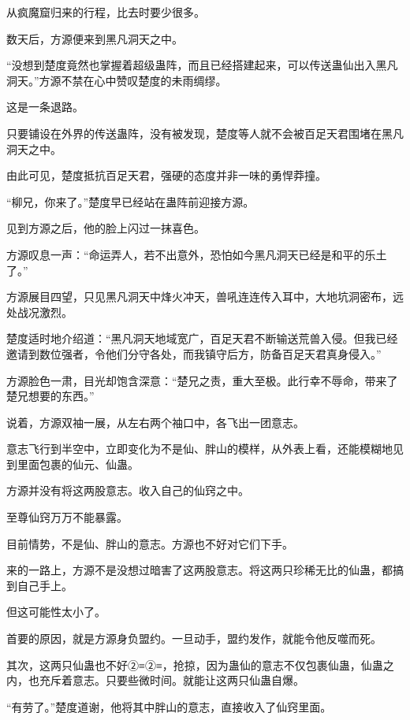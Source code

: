 
\begin{this_body}

从疯魔窟归来的行程，比去时要少很多。

数天后，方源便来到黑凡洞天之中。

“没想到楚度竟然也掌握着超级蛊阵，而且已经搭建起来，可以传送蛊仙出入黑凡洞天。”方源不禁在心中赞叹楚度的未雨绸缪。

这是一条退路。

只要铺设在外界的传送蛊阵，没有被发现，楚度等人就不会被百足天君围堵在黑凡洞天之中。

由此可见，楚度抵抗百足天君，强硬的态度并非一味的勇悍莽撞。

“柳兄，你来了。”楚度早已经站在蛊阵前迎接方源。

见到方源之后，他的脸上闪过一抹喜色。

方源叹息一声：“命运弄人，若不出意外，恐怕如今黑凡洞天已经是和平的乐土了。”

方源展目四望，只见黑凡洞天中烽火冲天，兽吼连连传入耳中，大地坑洞密布，远处战况激烈。

楚度适时地介绍道：“黑凡洞天地域宽广，百足天君不断输送荒兽入侵。但我已经邀请到数位强者，令他们分守各处，而我镇守后方，防备百足天君真身侵入。”

方源脸色一肃，目光却饱含深意：“楚兄之责，重大至极。此行幸不辱命，带来了楚兄想要的东西。”

说着，方源双袖一展，从左右两个袖口中，各飞出一团意志。

意志飞行到半空中，立即变化为不是仙、胖山的模样，从外表上看，还能模糊地见到里面包裹的仙元、仙蛊。

方源并没有将这两股意志。收入自己的仙窍之中。

至尊仙窍万万不能暴露。

目前情势，不是仙、胖山的意志。方源也不好对它们下手。

来的一路上，方源不是没想过暗害了这两股意志。将这两只珍稀无比的仙蛊，都搞到自己手上。

但这可能性太小了。

首要的原因，就是方源身负盟约。一旦动手，盟约发作，就能令他反噬而死。

其次，这两只仙蛊也不好②≡②≡，抢掠，因为蛊仙的意志不仅包裹仙蛊，仙蛊之内，也充斥着意志。只要些微时间。就能让这两只仙蛊自爆。

“有劳了。”楚度道谢，他将其中胖山的意志，直接收入了仙窍里面。


\end{this_body}

